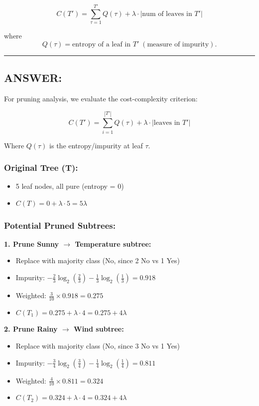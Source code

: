 \documentclass[12pt]{article}
\begin{document}
\[
C(T') = \sum_{\tau=1}^{T'} Q(\tau) + \lambda \cdot \lvert \text{num of leaves in } T' \rvert
\]

where
\[
Q(\tau) = \text{entropy of a leaf in } T' \; (\text{measure of impurity}).
\]

\vspace{1em}
\hrule
\vspace{1em}
\subsection*{ANSWER:}
For pruning analysis, we evaluate the cost-complexity criterion:

\begin{equation*}
C(T') = \sum_{i=1}^{|T'|} Q(\tau) + \lambda \cdot |\text{leaves in } T'|
\end{equation*}

Where $Q(\tau)$ is the entropy/impurity at leaf $\tau$.

\subsubsection*{Original Tree (T):}
\begin{itemize}
    \item 5 leaf nodes, all pure (entropy = 0)
    \item $C(T) = 0 + \lambda \cdot 5 = 5\lambda$
\end{itemize}

\subsubsection*{Potential Pruned Subtrees:}

\textbf{1. Prune Sunny $\rightarrow$ Temperature subtree:}
\begin{itemize}
    \item Replace with majority class (No, since 2 No vs 1 Yes)
    \item Impurity: $-\frac{2}{3}\log_2\left(\frac{2}{3}\right) - \frac{1}{3}\log_2\left(\frac{1}{3}\right) = 0.918$
    \item Weighted: $\frac{3}{10} \times 0.918 = 0.275$
    \item $C(T_1) = 0.275 + \lambda \cdot 4 = 0.275 + 4\lambda$
\end{itemize}

\textbf{2. Prune Rainy $\rightarrow$ Wind subtree:}
\begin{itemize}
    \item Replace with majority class (No, since 3 No vs 1 Yes)
    \item Impurity: $-\frac{3}{4}\log_2\left(\frac{3}{4}\right) - \frac{1}{4}\log_2\left(\frac{1}{4}\right) = 0.811$
    \item Weighted: $\frac{4}{10} \times 0.811 = 0.324$
    \item $C(T_2) = 0.324 + \lambda \cdot 4 = 0.324 + 4\lambda$
\end{itemize}
\end{document}
